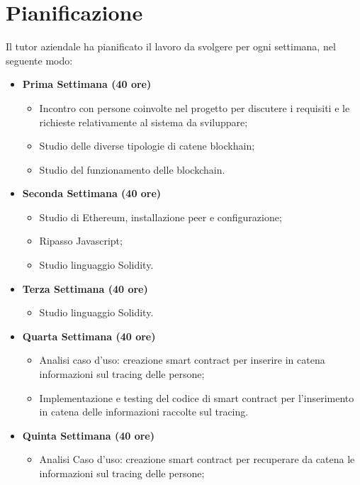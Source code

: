 \section{Pianificazione}
Il tutor aziendale ha pianificato il lavoro da svolgere per ogni settimana, nel seguente modo:
\begin{itemize}
        \item \textbf{Prima Settimana (40 ore)}
        \begin{itemize}
            \item Incontro con persone coinvolte nel progetto per discutere i requisiti e le richieste
            relativamente al sistema da sviluppare;
            \item Studio delle diverse tipologie di catene blockhain; 
            \item Studio del funzionamento delle blockchain.
        \end{itemize}
        \item \textbf{Seconda Settimana (40 ore)} 
        \begin{itemize}
            \item Studio di Ethereum, installazione peer e configurazione;
	    \item Ripasso Javascript;	
	    \item Studio linguaggio Solidity.
        \end{itemize}
        \item \textbf{Terza Settimana (40 ore)} 
        \begin{itemize}
            \item Studio linguaggio Solidity.
        \end{itemize}
        \item \textbf{Quarta Settimana (40 ore)} 
        \begin{itemize}
            \item Analisi caso d'uso: creazione smart contract per inserire in catena informazioni sul tracing delle persone;
	    \item Implementazione e testing del codice di smart contract per l'inserimento in catena delle informazioni raccolte sul tracing.
        \end{itemize}
        \item \textbf{Quinta Settimana (40 ore)} 
        \begin{itemize}
            \item Analisi Caso d'uso: creazione smart contract per recuperare da catena le informazioni sul tracing delle persone;

\end{itemize}
\end{itemize}
